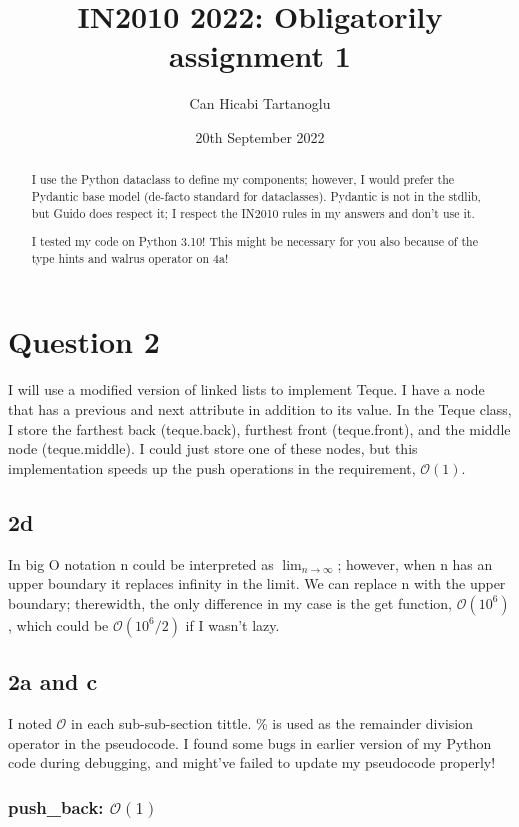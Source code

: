 \documentclass[]{article}
\title{IN2010 2022: Obligatorily assignment 1}
\author{Can Hicabi Tartanoglu}
\date{20th September 2022}
\begin{document}
\maketitle

\begin{abstract}
	I use the Python dataclass to define my components; however, I would prefer the Pydantic base model (de-facto standard for dataclasses). Pydantic is not in the stdlib, but Guido does respect it; I respect the IN2010 rules in my answers and don't use it.
	
	I tested my code on Python 3.10! This might be necessary for you also because of the type hints and walrus operator on 4a!
\end{abstract}

\section*{Question 2}

I will use a modified version of linked lists to implement Teque. I have a node that has a previous and next attribute in addition to its value. In the Teque class, I store the farthest back (teque.back), furthest front (teque.front), and the middle node (teque.middle). I could just store one of these nodes, but this implementation speeds up the push operations in the requirement, $\mathcal{O}(1)$.

\subsection*{2d}

In big O notation n could be interpreted as $\lim_{n \to \infty}$; however, when n has an upper boundary it replaces infinity in the limit. We can replace n with the upper boundary; therewidth, the only difference in my case is the get function, $\mathcal{O}(10^6)$, which could be $\mathcal{O}(10^6/2)$ if I wasn't lazy.

\subsection*{2a and c}

I noted $\mathcal{O}$ in each sub-sub-section tittle. \% is used as the remainder division operator in the pseudocode. I found some bugs in earlier version of my Python code during debugging, and might've failed to update my pseudocode properly!

\subsubsection*{push\_back: $\mathcal{O}(1)$}
\end{document}
